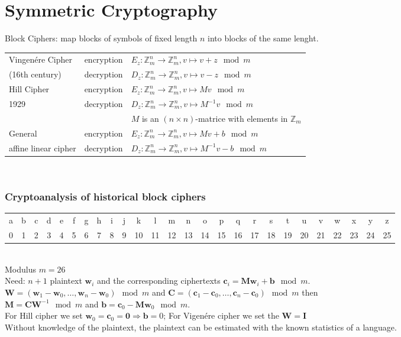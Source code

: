 \section{Symmetric Cryptography}
Block Ciphers: map blocks of symbols of fixed length $n$ into blocks of the same lenght.\\
\begin{tabular}{|l l |l|}
	\hline
	Vingen\'{e}re Cipher &	encryption	&	$E_z: \mathbb{Z}_m^n \to \mathbb{Z}_m^n, v \mapsto v + z \mod m$ \\
							         \cline{2-3}
	(16th century)       &	decryption	&	$D_z: \mathbb{Z}_m^n \to \mathbb{Z}_m^n, v \mapsto v - z \mod m$ \\
	\hline
	Hill Cipher				   &	encryption	&	$E_z: \mathbb{Z}_m^n \to \mathbb{Z}_m^n, v \mapsto Mv \mod m$ \\
							         \cline{2-3}
	1929  						   &	decryption	&	$D_z: \mathbb{Z}_m^n \to \mathbb{Z}_m^n, v \mapsto M^{-1}v \mod m$ \\
							         &				      &	$M$ is an $(n \times n)$-matrice with elements in $\mathbb{Z}_m$ \\
	\hline
	General					     &	encryption	&	$E_z: \mathbb{Z}_m^n \to \mathbb{Z}_m^n, v \mapsto Mv + b \mod m$ \\
							         \cline{2-3}
	affine linear cipher &	decryption	&	$D_z: \mathbb{Z}_m^n \to \mathbb{Z}_m^n, v \mapsto M^{-1}v -b \mod m$ \\
	\hline
\end{tabular}\\
\subsubsection{Cryptoanalysis of historical block ciphers}
\begin{tabular}{|cccccccccccccccccccccccccc|} %
	\hline
	a & b & c & d & e & f & g & h & i & j & k  & l  & m  & n  & o  & p  & q  & r  & s  & t  & u  & v  & w  & x  & y  & z  \\
	0 & 1 & 2 & 3 & 4 & 5 & 6 & 7 & 8 & 9 & 10 & 11 & 12 & 13 & 14 & 15 & 16 & 17 & 18 & 19 & 20 & 21 & 22 & 23 & 24 & 25 \\
	\hline
\end{tabular}\\
Modulus $m=26$\\

Need: $n+1$ plaintext $\bm w_i$ and the corresponding ciphertexts $\bm c_i=\bm M\bm w_i+\bm b \mod m$.\\
$\bm W=(\bm w_1-\bm w_0, \ldots , \bm w_n-\bm w_0)  \mod m$ and $\bm C=(\bm c_1-\bm c_0, \ldots , \bm c_n-\bm c_0) \mod m$ then \\
$\bm M=\bm C\bm W^{-1} \mod m$ and $\bm b=\bm c_0-\bm M\bm w_0 \mod m$.\\
For Hill cipher we set $\bm w_0=\bm c_0 = \bm 0 \Rightarrow \bm b=0$; For Vigen\'{e}re cipher we set the $\bm W = \bm I$\\
Without knowledge of the plaintext, the plaintext can be estimated with the known statistics of a language. 


